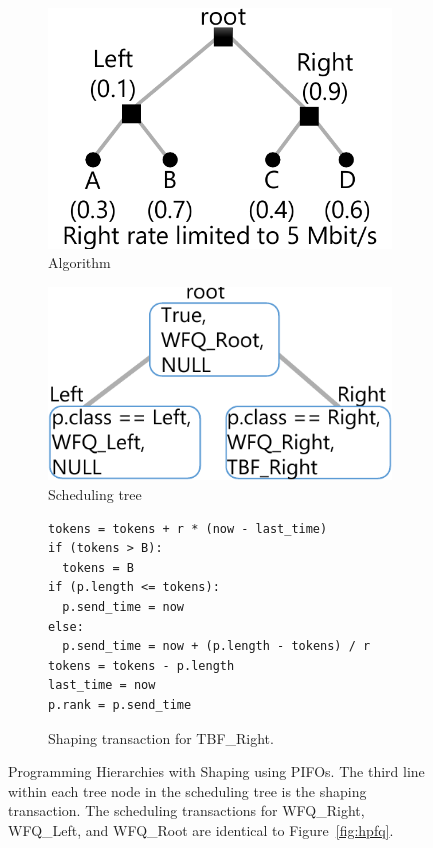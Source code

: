 \begin{figure}
\begin{subfigure}[b]{0.2\textwidth}
\includegraphics[width=\textwidth]{pifo_hshaping_example.pdf}
\caption{Algorithm}
\label{fig:hshaping_algo}
\end{subfigure}
\vrule
\begin{subfigure}[b]{0.3\textwidth}
\includegraphics[width=\textwidth]{pifo_hshaping_program.pdf}
\caption{Scheduling tree}
\label{fig:hshaping_tree}
\end{subfigure}
\vrule
\begin{subfigure}[b]{0.5\textwidth}
\begin{lstlisting}[style=customc]
tokens = tokens + r * (now - last_time)
if (tokens > B):
  tokens = B
if (p.length <= tokens):
  p.send_time = now
else:
  p.send_time = now + (p.length - tokens) / r
tokens = tokens - p.length
last_time = now
p.rank = p.send_time
\end{lstlisting}
\caption{Shaping transaction for TBF\_Right.}
\label{fig:hshaping_shaping_trans}
\end{subfigure}
\caption{Programming Hierarchies with Shaping using PIFOs. The third line
within each tree node in the scheduling tree is the shaping transaction. The scheduling
transactions for WFQ\_Right, WFQ\_Left, and WFQ\_Root are identical to
Figure~\ref{fig:hpfq}.}
\label{fig:hshaping}
\end{figure}


